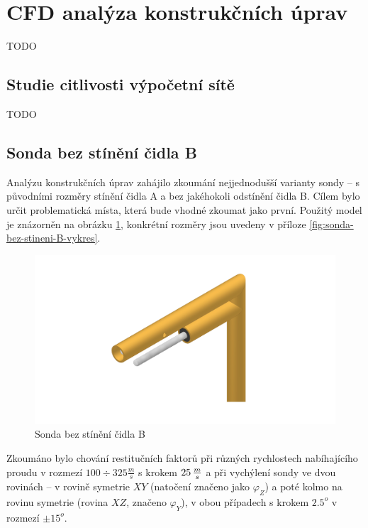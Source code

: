 \section{CFD analýza konstrukčních úprav} \label{sec:konstrukcni-upravy}
    TODO
    
    \subsection{Studie citlivosti výpočetní sítě}
        TODO
    \newpage
    \subsection{Sonda bez stínění čidla B}
        Analýzu konstrukčních úprav zahájilo zkoumání nejjednodušší varianty sondy – s původními rozměry stínění čidla A a bez jakéhokoli odstínění čidla B. Cílem bylo určit problematická místa, která bude vhodné zkoumat jako první. Použitý model je znázorněn na obrázku \ref{fig:sonda-bez-stineni-B}, konkrétní rozměry jsou uvedeny v příloze \ref{fig:sonda-bez-stineni-B-vykres}. 

        \begin{figure}[ht!]
            \centering
            \includegraphics[width=\textwidth]{400_SIMULACE_KONSTRUKCNICH_UPRAV/Vykresy_rendery/Sonda_bez_stineni_B.png}
            \caption{Sonda bez stínění čidla B}
            \label{fig:sonda-bez-stineni-B}
        \end{figure}
        
        Zkoumáno bylo chování restitučních faktorů při různých rychlostech nabíhajícího proudu v rozmezí $100 \div 325 \unit{\frac{m}{s}}$ s krokem $25 \, \frac{m}{s}$ a při vychýlení sondy ve dvou rovinách – v rovině symetrie $XY$ (natočení značeno jako $\varphi _Z$) a poté kolmo na rovinu symetrie (rovina $XZ$, značeno $\varphi _Y$), v obou případech s krokem $2.5^o$ v rozmezí $\pm 15^o$.
                

